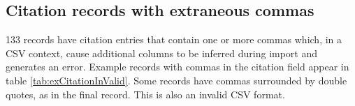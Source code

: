 \documentclass[10pt, letterpaper]{article}
\begin{document}
\begin{spacing}{1.0}

\clearpage

\subsection{Citation records with extraneous commas}

133 records have citation entries that contain one or more commas which, in a CSV context, cause additional columns to be inferred during import and generates an error.  Example records with commas in the citation field appear in table \ref{tab:exCitationInValid}. Some records have commas surrounded by double quotes, as in the final record.  This is also an invalid CSV format.

\vspace{0.25in}


\end{spacing}
\end{document}
